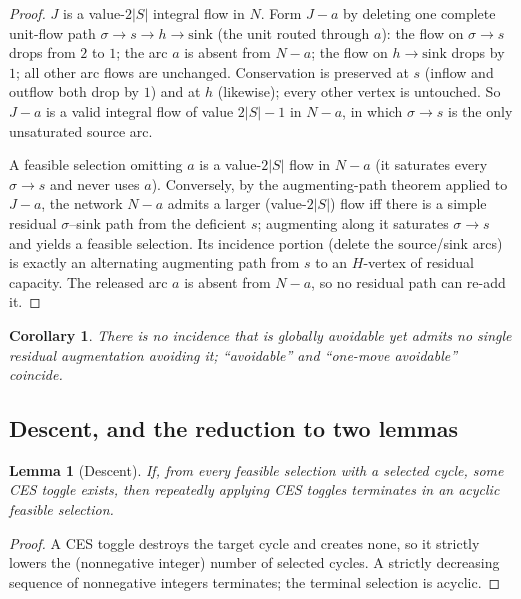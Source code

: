 \documentclass[11pt]{article}
\theoremstyle{plain}
\newtheorem{lemma}[theorem]{Lemma}
\newtheorem{corollary}[theorem]{Corollary}
\theoremstyle{definition}
\begin{document}
\begin{proof}
$J$ is a value-$2|S|$ integral flow in $N$. Form $J-a$ by deleting one complete
unit-flow path $\sigma\to s\to h\to\text{sink}$ (the unit routed through $a$):
the flow on $\sigma\to s$ drops from $2$ to $1$; the arc $a$ is absent from
$N-a$; the flow on $h\to\text{sink}$ drops by $1$; all other arc flows are
unchanged. Conservation is preserved at $s$ (inflow and outflow both drop by $1$)
and at $h$ (likewise); every other vertex is untouched. So $J-a$ is a valid
integral flow of value $2|S|-1$ in $N-a$, in which $\sigma\to s$ is the only
unsaturated source arc.

A feasible selection omitting $a$ is a value-$2|S|$ flow in $N-a$ (it saturates
every $\sigma\to s$ and never uses $a$). Conversely, by the augmenting-path
theorem applied to $J-a$, the network $N-a$ admits a larger (value-$2|S|$) flow
iff there is a simple residual $\sigma$--sink path from the deficient $s$;
augmenting along it saturates $\sigma\to s$ and yields a feasible selection. Its
incidence portion (delete the source/sink arcs) is exactly an alternating
augmenting path from $s$ to an $H$-vertex of residual capacity. The released arc
$a$ is absent from $N-a$, so no residual path can re-add it.
\end{proof}

\begin{corollary}\label{cor:noR2x}
There is no incidence that is globally avoidable yet admits no single residual
augmentation avoiding it; ``avoidable'' and ``one-move avoidable'' coincide.
\end{corollary}

\subsection{Descent, and the reduction to two lemmas}\label{sub:descent}

\begin{lemma}[Descent]\label{lem:C8}
If, from every feasible selection with a selected cycle, some CES toggle exists,
then repeatedly applying CES toggles terminates in an acyclic feasible selection.
\end{lemma}

\begin{proof}
A CES toggle destroys the target cycle and creates none, so it strictly lowers
the (nonnegative integer) number of selected cycles. A strictly decreasing
sequence of nonnegative integers terminates; the terminal selection is acyclic.
\end{proof}
\end{document}
